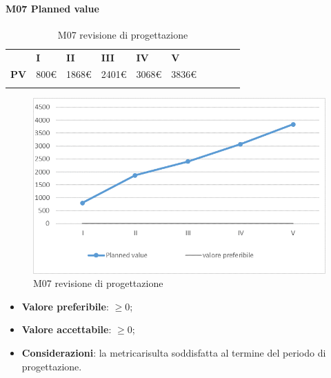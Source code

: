 \paragraph{M07 Planned value} \mbox{}
\begin{longtable}[H!] {						
		>{}p{38mm}  		
		>{}p{12mm}
		>{}p{12mm}		
		>{}p{12mm}		
		>{}p{12mm}		
		>{}p{12mm}		
		>{}p{12mm}
		>{}p{12mm}
		>{}p{12mm}
		>{}p{12mm}
	}
	\rowcolor{gray!50}
	\textbf{} & \textbf{I} & \textbf{II} & \textbf{III} & \textbf{IV} & \textbf{V} \TBstrut \\ [2mm]
	\textbf{PV} & 800\euro & 1868\euro & 2401\euro & 3068\euro & 3836\euro \TBstrut \\ [2mm]
	\rowcolor{white}
	\caption{M07 revisione di progettazione\glo}
\end{longtable}
\begin{figure}[H] 	
\includegraphics[width=\linewidth]{./img/grafici/RP4.png}	
\caption{M07 revisione di progettazione\glo}	
\end{figure}
\begin{itemize}
	\item \textbf{Valore preferibile}: $\ge0$;
	\item \textbf{Valore accettabile}: $\ge0$;
	\item \textbf{Considerazioni}: la metrica\glosp risulta soddisfatta al termine del periodo di progettazione\glo.
\end{itemize}
